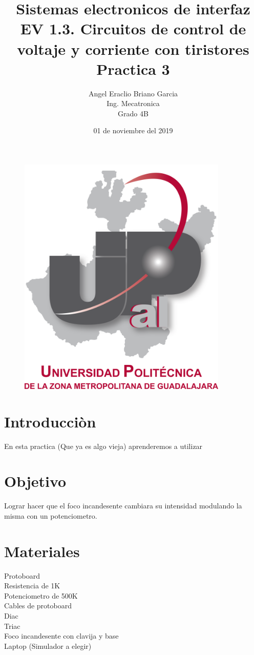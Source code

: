 \documentclass[12pt,a4paper]{article}
\begin{document}
\title{\textbf{Sistemas electronicos de interfaz\\EV 1.3. Circuitos de control de voltaje y corriente con tiristores\\Practica 3}}
\author{Angel Eraclio Briano Garcia\\Ing. Mecatronica\\Grado 4B}
\date{01 de noviembre del 2019}
\maketitle
\begin{figure}[h!]
\centering
\includegraphics[width=10cm]{UPCDLZMDG5783-logo.png} 
\end{figure}
\newpage

\section{Introducciòn}
En esta practica (Que ya es algo vieja) aprenderemos a utilizar 

\section{Objetivo}
Lograr hacer que el foco incandesente cambiara su intensidad modulando la misma con un potenciometro.

\section{Materiales}
Protoboard\\Resistencia de 1K\\Potenciometro de 500K\\Cables de protoboard\\Diac\\Triac\\Foco incandesente con clavija y base\\Laptop (Simulador a elegir)
\end{document}
